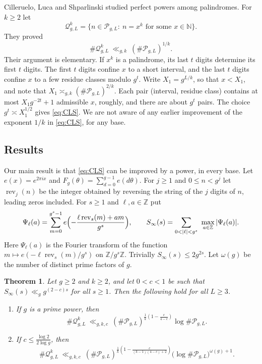 \documentclass[11pt]{amsart}
\newtheorem{theorem}{Theorem}[section]
\theoremstyle{definition}
\numberwithin{equation}{section}
\newcommand{\cP}{\mathcal{P}}
\newcommand{\cQ}{\mathcal{Q}}
\newcommand{\rev}{\operatorname{rev}}
\newcommand{\Z}{\mathbb{Z}}
\newcommand{\N}{\mathbb{N}}
\newcommand{\Sinf}{S_\infty}
\begin{document}
Cilleruelo, Luca and Shparlinski \cite{CLS} studied perfect powers among
palindromes. For $k\ge2$ let
\[
\cQ^k_{g,L}=\{n\in\cP_{g,L}:\ n=x^k\text{ for some }x\in\N\}.
\]
They proved
\begin{equation}\label{eq:CLS}
\#\cQ^k_{g,L}\ \ll_{g,k}\ (\#\cP_{g,L})^{1/k}.
\end{equation}
Their argument is elementary. If $x^k$ is a palindrome, its last $t$ digits
determine its first $t$ digits. The first $t$ digits confine $x$ to a short
interval, and the last $t$ digits confine $x$ to a few residue classes
modulo $g^t$. Write $X_1=g^{L/k}$, so that $x<X_1$, and note that
$X_1\asymp_{g,k}(\#\cP_{g,L})^{2/k}$. Each pair (interval, residue class)
contains at most $X_1g^{-2t}+1$ admissible $x$, roughly, and there are about
$g^t$ pairs. The choice $g^t\asymp X_1^{1/2}$ gives \eqref{eq:CLS}. We are not
aware of any earlier improvement of the exponent $1/k$ in \eqref{eq:CLS},
for any base.

\subsection{Results}
Our main result is that \eqref{eq:CLS} can be improved by a power, in
every base. Let $e(x)=e^{2\pi ix}$ and $F_g(\theta)=\sum_{d=0}^{g-1}e(d\theta)$.
For $j\ge1$ and $0\le n<g^j$ let $\rev_j(n)$ be the integer obtained by
reversing the string of the $j$ digits of $n$, leading zeros included. For
$s\ge1$ and $\ell,a\in\Z$ put
\[
\Psi_\ell(a)=\sum_{m=0}^{g^s-1}e\Bigl(-\frac{\ell\rev_s(m)+am}{g^s}\Bigr),
\qquad
\Sinf(s)=\sum_{0<|\ell|<g^s}\ \max_{a\in\Z}|\Psi_\ell(a)|.
\]
Here $\Psi_\ell(a)$ is the Fourier transform of the function
$m\mapsto e(-\ell\rev_s(m)/g^s)$ on $\Z/g^s\Z$. Trivially
$\Sinf(s)\le2g^{2s}$. Let $\omega(g)$ be the number of distinct prime factors
of $g$.

\begin{theorem}\label{thm:main}
Let $g\ge2$ and $k\ge2$, and let $0<c<1$ be such that
$\Sinf(s)\ll_gg^{(2-c)s}$ for all $s\ge1$. Then the following hold for all
$L\ge3$.
\begin{enumerate}[label=\textup{(\alph*)}]
\item If $g$ is a prime power, then
\[
\#\cQ^k_{g,L}\ \ll_{g,k,c}\ (\#\cP_{g,L})^{\frac1k\left(1-\frac{c}{4-c}\right)}\log\#\cP_{g,L}.
\]
\item If $c\le\frac{\log2}{2\log g}$, then
\[
\#\cQ^k_{g,L}\ \ll_{g,k,c}\ (\#\cP_{g,L})^{\frac1k\left(1-\frac{c}{(k-1)(4-c)+2}\right)}\bigl(\log\#\cP_{g,L}\bigr)^{\omega(g)+1}.
\]
\end{enumerate}
\end{theorem}
\end{document}
